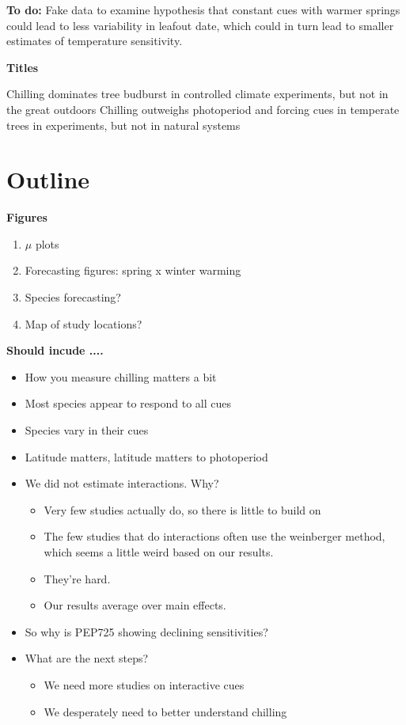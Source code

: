 \documentclass[11pt,letter]{article}
\begin{document}

\renewcommand{\refname}{\CHead{}}

{\bf To do:} Fake data to examine hypothesis that constant cues with warmer springs could lead to less variability in leafout date, which could in turn lead to smaller estimates of temperature sensitivity.

{\bf Titles}

Chilling dominates tree budburst in controlled climate experiments, but not in the great outdoors
Chilling outweighs photoperiod and forcing cues in temperate trees in experiments, but not in natural systems

\section{Outline}

{\bf Figures}

\begin{enumerate}
\item $\mu$ plots
\item Forecasting figures: spring x winter warming
\item Species forecasting?
\item Map of study locations?
\end{enumerate}

{\bf Should incude ....}
\begin{itemize}
\item How you measure chilling matters a bit
\item Most species appear to respond to all cues
\item Species vary in their cues
\item Latitude matters, latitude matters to photoperiod
\item We did not estimate interactions. Why?
\begin{itemize}
\item Very few studies actually do, so there is little to build on
\item The few studies that do interactions often use the weinberger method, which seems a little weird based on our results.
\item They're hard.
\item Our results average over main effects. 
\end{itemize}
\item So why is PEP725 showing declining sensitivities?
\item What are the next steps?
\begin{itemize}
\item We need more studies on interactive cues
\item We desperately need to better understand chilling
\end{itemize}
\end{itemize}
\end{document}
